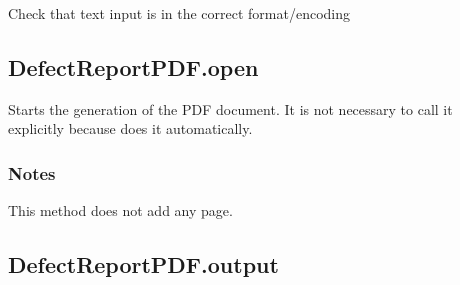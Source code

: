 \documentclass[letterpaper,10pt,english]{sphinxmanual}
\begin{document}
\begin{fulllineitems}
\begin{fulllineitems}
\label{\detokenize{generated/quality_assessment.quality_pdf_report.DefectReportPDF.normalize_text:quality_assessment.quality_pdf_report.DefectReportPDF.normalize_text}}
\sphinxAtStartPar
Check that text input is in the correct format/encoding

\end{fulllineitems}



\subsection{DefectReportPDF.open}
\label{\detokenize{generated/quality_assessment.quality_pdf_report.DefectReportPDF.open:defectreportpdf-open}}\label{\detokenize{generated/quality_assessment.quality_pdf_report.DefectReportPDF.open::doc}}

\begin{fulllineitems}
\label{\detokenize{generated/quality_assessment.quality_pdf_report.DefectReportPDF.open:quality_assessment.quality_pdf_report.DefectReportPDF.open}}
\sphinxAtStartPar
Starts the generation of the PDF document.
It is not necessary to call it explicitly because  does it automatically.
\subsubsection*{Notes}

\sphinxAtStartPar
This method does not add any page.

\end{fulllineitems}



\subsection{DefectReportPDF.output}
\label{\detokenize{generated/quality_assessment.quality_pdf_report.DefectReportPDF.output:defectreportpdf-output}}\label{\detokenize{generated/quality_assessment.quality_pdf_report.DefectReportPDF.output::doc}}


\end{fulllineitems}
\end{document}
